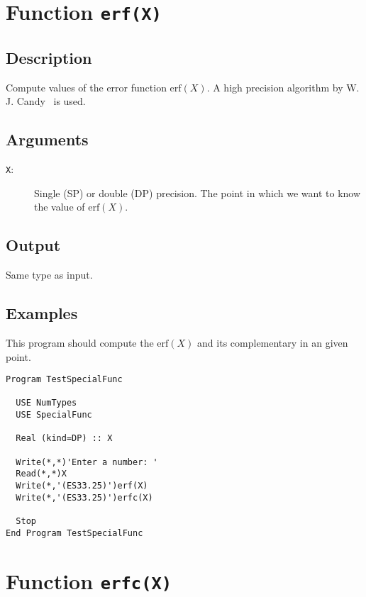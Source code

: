 \section{Function \texttt{erf(X)}}

\subsection{Description}

Compute values of the error function $\text{erf}(X)$. A high
precision algorithm by W. J. Candy~\cite{cody:1969aa} is used.

\subsection{Arguments}

\begin{description}
\item[\texttt{X}:] Single (SP) or double (DP) precision. The point in
  which we want to know the value of $\text{erf}(X)$.
\end{description}

\subsection{Output}

Same type as input.

\subsection{Examples}

This program should compute the $\text{erf}(X)$ and its complementary
in an given point.

\begin{lstlisting}[emph=erf,
                   emphstyle=\color{blue},
                   frame=trBL,
                   caption=Computing the Error Function.,
                   label=erf]
Program TestSpecialFunc

  USE NumTypes
  USE SpecialFunc

  Real (kind=DP) :: X

  Write(*,*)'Enter a number: '
  Read(*,*)X
  Write(*,'(ES33.25)')erf(X)
  Write(*,'(ES33.25)')erfc(X)

  Stop
End Program TestSpecialFunc
\end{lstlisting}

\section{Function \texttt{erfc(X)}}

